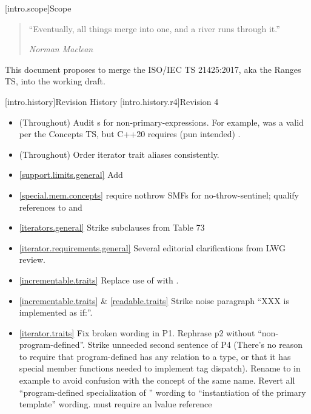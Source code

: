 [intro.scope]{Scope}

\begin{quote}
``Eventually, all things merge into one, and a river runs through it.''
\begin{flushright}
\textemdash \textit{Norman Maclean}
\end{flushright}
\end{quote}

\pnum
This document proposes to merge the ISO/IEC TS 21425:2017, aka the Ranges TS,
into the working draft.

[intro.history]{Revision History}
[intro.history.r4]{Revision 4}
\begin{itemize}
\item (Throughout) Audit s for
  non-primary-expressions. For example,  was a valid
   per the Concepts TS, but C++20 requires
  (pun intended) .
\item (Throughout) Order iterator trait aliases consistently.
\item \ref{support.limits.general} Add 
\item \ref{special.mem.concepts} require nothrow SMFs for no-throw-sentinel;
  qualify references to  and 
\item \ref{iterators.general} Strike subclauses from Table 73
\item \ref{iterator.requirements.general} Several editorial clarifications from
  LWG review.
\item \ref{incrementable.traits} Replace use of  with
  .
\item \ref{incrementable.traits} \& \ref{readable.traits} Strike noise paragraph
  ``XXX is implemented as if:''.
\item \ref{iterator.traits} Fix broken wording in P1. Rephrase p2 without
  ``non-program-defined''. Strike unneeded second sentence of P4
  (There's no reason to require that program-defined 
  has any relation to a  type, or that it has special member
  functions needed to implement tag dispatch). Rename 
  to  in example to avoid confusion with the concept of the same name.
  Revert all ``program-defined specialization of '' wording
  to ``instantiation of the primary template'' wording.
   must require an lvalue reference

\end{itemize}
